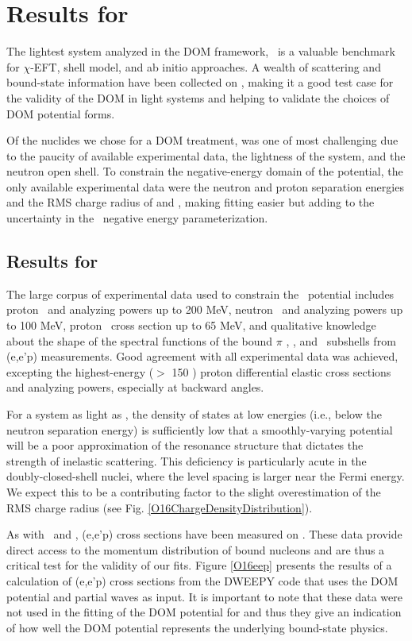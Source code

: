 \section{Results for \oSixEight}
The lightest system analyzed in the DOM framework, \oSix\ is a valuable benchmark
for $\chi$-EFT, shell model, and ab initio approaches. A wealth of scattering and
bound-state information have been collected on \oSix, making it a good test case for the validity
of the DOM in light systems and helping to validate the choices of DOM potential forms.

Of the nuclides we chose for a DOM treatment, \oEight was one of most challenging due to the paucity of
available experimental data, the lightness of the system, and the neutron open shell.
To constrain the negative-energy domain
of the potential, the only available experimental data were the neutron and proton separation
energies and the RMS charge radius of \oEight and \neEight, making fitting easier but adding to the
uncertainty in the \oEight\ negative energy parameterization.

\subsection{Results for \oSix}
The large corpus of experimental data used to constrain the \oSix\
potential includes proton \el\ and analyzing powers up to 200 MeV, neutron \el\ and analyzing powers
up to 100 MeV, proton \rxn\ cross section up to 65 MeV, and qualitative knowledge about the shape of
the spectral functions of the bound $\pi$ \sOne, \pThree, and \pOne\ subshells from (e,e'p)
measurements. Good agreement with all 
experimental data was achieved, excepting the highest-energy ($>$ 150 \mega\electronvolt)
proton differential elastic cross sections and analyzing powers, especially at backward angles.

For a system as light as \oSix, the density of states at low energies (i.e., below the neutron
separation energy) is sufficiently low that a smoothly-varying potential will be a poor
approximation of the resonance structure that dictates the strength of inelastic scattering. This
deficiency is particularly acute in the doubly-closed-shell nuclei, where the level spacing is
larger near the Fermi energy. We expect this to be a contributing factor to the slight
overestimation of the RMS charge radius (see Fig. \ref{O16ChargeDensityDistribution}).

As with \caForty\ and \pbEight, (e,e'p) cross sections have been measured on \oSix. These data
provide direct access to the momentum distribution of bound nucleons and are thus a critical test
for the validity of our fits. Figure \ref{O16eep} presents the results of a calculation of (e,e'p)
cross sections from the DWEEPY code \cite{Atkinson2018, Giusti2011} that uses the DOM potential and partial waves as input.
It is important to note that these data were not used in the fitting of the DOM potential for \oSix
and thus they give an indication of how well the DOM potential represents the underlying bound-state
physics.

